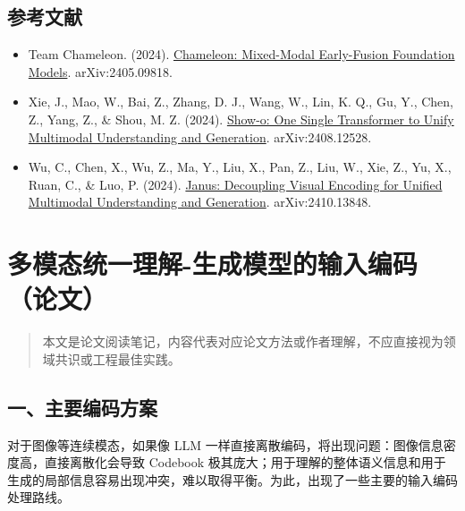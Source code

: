 \hypertarget{ux53c2ux8003ux6587ux732e-195}{%
\subsection{参考文献}\label{ux53c2ux8003ux6587ux732e-195}}

\begin{itemize}
\tightlist
\item
  Team Chameleon. (2024). \href{https://arxiv.org/abs/2405.09818}{Chameleon: Mixed-Modal Early-Fusion Foundation Models}. arXiv:2405.09818.
\item
  Xie, J., Mao, W., Bai, Z., Zhang, D. J., Wang, W., Lin, K. Q., Gu, Y., Chen, Z., Yang, Z., \& Shou, M. Z. (2024). \href{https://arxiv.org/abs/2408.12528}{Show-o: One Single Transformer to Unify Multimodal Understanding and Generation}. arXiv:2408.12528.
\item
  Wu, C., Chen, X., Wu, Z., Ma, Y., Liu, X., Pan, Z., Liu, W., Xie, Z., Yu, X., Ruan, C., \& Luo, P. (2024). \href{https://arxiv.org/abs/2410.13848}{Janus: Decoupling Visual Encoding for Unified Multimodal Understanding and Generation}. arXiv:2410.13848.
\end{itemize}

\clearpage

\hypertarget{ux591aux6a21ux6001ux7edfux4e00ux7406ux89e3-ux751fux6210ux6a21ux578bux7684ux8f93ux5165ux7f16ux7801ux8bbaux6587}{%
\section{多模态统一理解-生成模型的输入编码（论文）}\label{ux591aux6a21ux6001ux7edfux4e00ux7406ux89e3-ux751fux6210ux6a21ux578bux7684ux8f93ux5165ux7f16ux7801ux8bbaux6587}}

\begin{quote}
本文是论文阅读笔记，内容代表对应论文方法或作者理解，不应直接视为领域共识或工程最佳实践。
\end{quote}

\hypertarget{ux4e00ux4e3bux8981ux7f16ux7801ux65b9ux6848}{%
\subsection{一、主要编码方案}\label{ux4e00ux4e3bux8981ux7f16ux7801ux65b9ux6848}}

对于图像等连续模态，如果像 LLM 一样直接离散编码，将出现问题：图像信息密度高，直接离散化会导致 Codebook 极其庞大；用于理解的整体语义信息和用于生成的局部信息容易出现冲突，难以取得平衡。为此，出现了一些主要的输入编码处理路线。


